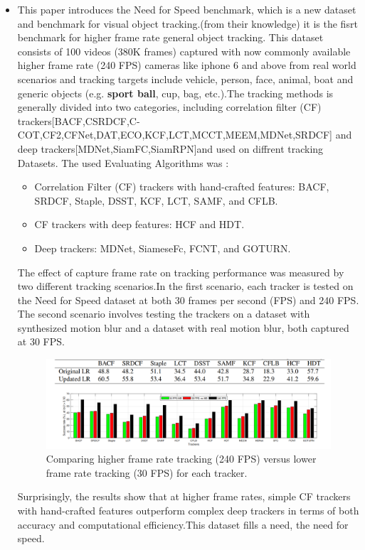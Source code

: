 \documentclass[12pt]{article}
\begin{document}
\begin{itemize}
        \item 
        This paper introduces the Need for Speed benchmark\cite{need_for_speed}, which is a new dataset and benchmark for visual object tracking.(from their knowledge) it is the fisrt benchmark for higher frame rate general object tracking. This dataset consists of 100 videos (380K frames) captured with now commonly available higher frame rate (240 FPS) cameras like iphone 6 and above from real world scenarios and tracking targets include vehicle, person, face, animal, boat and generic objects (e.g.\textbf{ sport ball}, cup, bag, etc.).The tracking methods is generally divided into two categories, including correlation filter (CF) trackers[BACF,CSRDCF,C-COT,CF2,CFNet,DAT,ECO,KCF,LCT,MCCT,MEEM,MDNet,SRDCF] and deep trackers[MDNet,SiamFC,SiamRPN]and used on diffrent tracking Datasets. The used Evaluating Algorithms was :
        \begin{itemize}
            \item Correlation Filter (CF) trackers with hand-crafted features:         BACF, SRDCF, Staple, DSST, KCF, LCT, SAMF, and CFLB.
            \item CF trackers with deep features: HCF and HDT.
            \item Deep trackers: MDNet, SiameseFc, FCNT, and GOTURN.
        \end{itemize}
        The effect of capture frame rate on tracking performance was measured by two different tracking scenarios.In the first scenario, each tracker is tested on the Need for Speed dataset at both 30 frames per second (FPS) and 240 FPS. The second scenario involves testing the trackers on a dataset with synthesized motion blur and a dataset with real motion blur, both captured at 30 FPS.
        \begin{figure}[H]
        \centering
        \includegraphics[width=1\linewidth]{figures/Need for Speed results.png}
        \caption{Comparing higher frame rate tracking (240 FPS) versus lower frame rate tracking (30 FPS) for each tracker. }
        \label{fig:Comparing higher frame rate tracking (240 FPS) versus lower frame rate tracking (30 FPS) for each tracker. }
        \end{figure}
        Surprisingly, the results show that at higher frame rates, simple CF trackers with hand-crafted features outperform complex deep trackers in terms of both accuracy and computational efficiency.This dataset fills a need, the need for speed.


\end{itemize}
\end{document}
